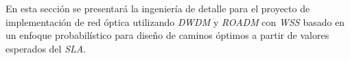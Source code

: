  
 
 
 
 

En esta sección se presentará la ingeniería de detalle para el
proyecto de implementación de red óptica utilizando \emph{DWDM} y
\emph{ROADM} con \emph{WSS} basado en un enfoque probabilístico para
diseño de caminos óptimos a partir de valores esperados del
\emph{SLA}.

